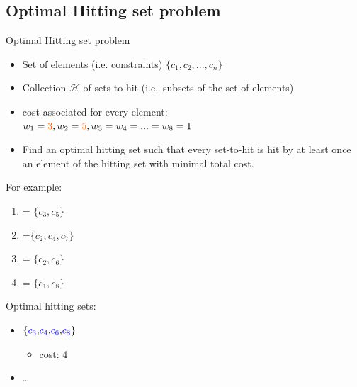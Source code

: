 \documentclass{beamer}
\newcommand\m[1]{\ensuremath{\mathcal{#1}}\xspace}
\renewcommand\emph[1]{{\color{vuborange}#1}}
\begin{document}
\subsection{Optimal Hitting set problem}

\begin{frame}
	\tableofcontents[currentsubsection]
\end{frame}			
\begin{frame}{\emph{Optimal} Hitting set problem}
	\pause
	\begin{itemize}
		\item Set of elements (i.e. constraints) $\{c_1,c_2,...,c_n\}$
		\item Collection $\m{H}$ of sets-to-hit  (i.e.~subsets of the set of elements)
		\item cost associated for every element:\\
		\hspace*{2cm}$w_1 =  \emph{3}, w_2= \emph{5}, w_3 = w_4 = ...= w_8 = 1$\pause \vfill
		\item[\textbf{Goal}] Find an \emph{optimal} hitting set such that every set-to-hit is hit by at least once an element of the hitting set with \emph{minimal total cost}.
	\end{itemize} \pause
	\vfill
	\begin{minipage}{0.48\textwidth}
		For example: 
		\begin{enumerate}
			\item[$H_1$] = $\{c_3, c_5\}$
			\item[$H_2$] =$\{c_2, c_4, c_7\}$
			\item[$H_3$] = $\{c_2, c_6\}$
			\item[$H_4$] = $\{c_1, c_8\}$
		\end{enumerate}
	\end{minipage}
	\begin{minipage}{0.48\textwidth}
		Optimal hitting sets:\pause
		\begin{itemize}
			\item $\{{{\color{blue}c_3},} {{\color{blue}c_4},} {{\color{blue}c_6},} {{\color{blue}c_8}}\}$ \emph{\checkmark}
				\begin{itemize}
					\item cost: \emph{4}
			\end{itemize}
				\item \dots
		\end{itemize}
	\end{minipage}
\end{frame}
\end{document}
